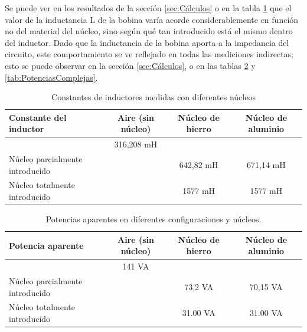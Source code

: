 \documentclass{article}
\begin{document}
            Se puede ver en los resultados de la sección \ref{sec:Cálculos} o en la tabla \ref{tab:ConstantesDelInductor} que el valor de la inductancia L de la bobina varía acorde considerablemente en función no del material del núcleo, sino según qué tan introducido está el mismo dentro del inductor. Dado que la inductancia de la bobina aporta a la impedancia del circuito, este comportamiento se ve reflejado en todas las mediciones indirectas; esto se puede observar en la sección \ref{sec:Cálculos}, o en las tablas \ref{tab:PotenciasAparentes} y \ref{tab:PotenciasComplejas}.
            
             \begin{table}[H]
                \centering
                \begin{tabular}{|l|c|c|c|}
                \hline
                Constante del inductor               & Aire (sin núcleo)     & Núcleo de hierro & Núcleo de aluminio \\ \hline
                                                    & 316,208 mH             &                  &                     \\ \hline
                Núcleo parcialmente introducido     &                        & 642,82 mH        & 671,14 mH            \\ \hline
                Núcleo totalmente introducido       &                        & 1577 mH          & 1577 mH                \\ \hline
                \end{tabular}
                \caption{Constantes de inductores medidas con diferentes núcleos}
                \label{tab:ConstantesDelInductor}
            \end{table}

            
            \begin{table}[H]
                \centering
                \begin{tabular}{|l|c|c|c|}
                \hline
                Potencia aparente                    & Aire (sin núcleo)  & Núcleo de hierro & Núcleo de aluminio \\ \hline
                                                    & 141 VA             &                  &                     \\ \hline
                Núcleo parcialmente introducido     &                    &  73,2 VA         &  70,15 VA           \\ \hline
                Núcleo totalmente introducido       &                    &  31.00 VA        &  31.00 VA           \\ \hline
                \end{tabular}
                \caption{Potencias aparentes  en diferentes configuraciones y núcleos.}
                \label{tab:PotenciasAparentes}
            \end{table}
\end{document}

